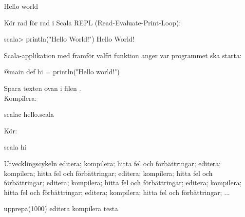 \begin{Slide}{Hello world}

Kör rad för rad i Scala REPL (Read-Evaluate-Print-Loop):
\begin{REPLnonum}
scala> println("Hello World!")
Hello World!
\end{REPLnonum}

\pause
\noindent Scala-applikation med  framför valfri funktion anger var programmet ska starta:
\begin{Code}
@main def hi = println("Hello world!")
\end{Code}
\noindent Spara texten ovan i filen .\\
Kompilera:
\begin{REPLnonum}
scalac hello.scala
\end{REPLnonum}
\noindent Kör:
\begin{REPLnonum}
scala hi
\end{REPLnonum}
\end{Slide}

\begin{Slide}{Utvecklingscykeln}
editera; kompilera; hitta fel och förbättringar; editera; kompilera; hitta fel och förbättringar; editera; kompilera; hitta fel och förbättringar; editera; kompilera; hitta fel och förbättringar; editera; kompilera; hitta fel och förbättringar; editera; kompilera; hitta fel och förbättringar; ...

\begin{Code}
upprepa(1000){
  editera
  kompilera
  testa
}
\end{Code}
\end{Slide}

